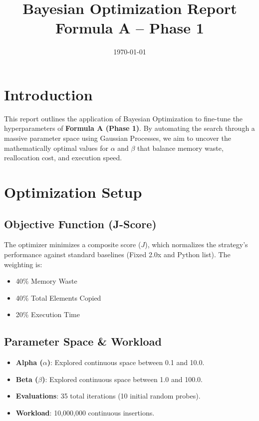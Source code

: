 \documentclass[11pt, a4paper]{article}
\title{Bayesian Optimization Report \\ \Large Formula A -- Phase 1}
\author{}
\date{\today}
\begin{document}
\maketitle
\tableofcontents
\listoffigures
\listoftables
\newpage

\section{Introduction}
This report outlines the application of Bayesian Optimization to fine-tune the hyperparameters of \textbf{Formula A (Phase 1)}. By automating the search through a massive parameter space using Gaussian Processes, we aim to uncover the mathematically optimal values for $\alpha$ and $\beta$ that balance memory waste, reallocation cost, and execution speed.

\section{Optimization Setup}

\subsection{Objective Function (J-Score)}
The optimizer minimizes a composite score ($J$), which normalizes the strategy's performance against standard baselines (Fixed 2.0x and Python list). The weighting is:
\begin{itemize}
    \item 40\% Memory Waste
    \item 40\% Total Elements Copied
    \item 20\% Execution Time
\end{itemize}

\subsection{Parameter Space \& Workload}
\begin{itemize}
    \item \textbf{Alpha ($\alpha$)}: Explored continuous space between 0.1 and 10.0.
    \item \textbf{Beta ($\beta$)}: Explored continuous space between 1.0 and 100.0.
    \item \textbf{Evaluations}: 35 total iterations (10 initial random probes).
    \item \textbf{Workload}: 10,000,000 continuous insertions.
\end{itemize}
\end{document}
